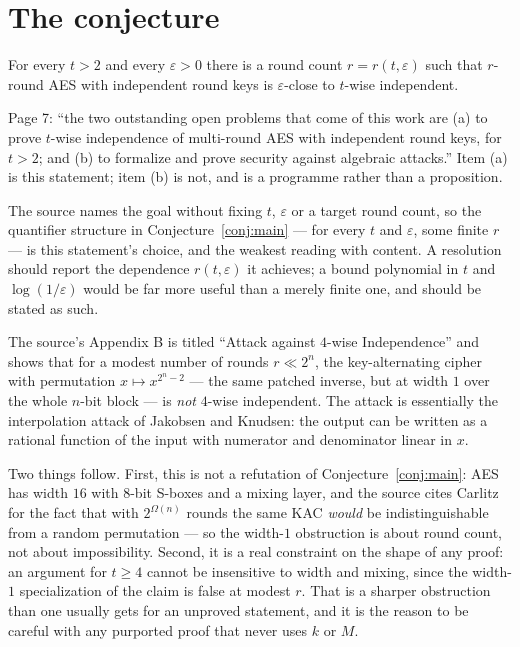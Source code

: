 \documentclass{aicr-conjecture}
\newcommand{\Om}{\Omega}
\newcommand{\eps}{\varepsilon}
\begin{document}
\section{The conjecture}\label{sec:conjectures}

\begin{conjecture}\label{conj:main}
For every $t > 2$ and every $\eps > 0$ there is a round count $r =
r(t,\eps)$ such that $r$-round AES with independent round keys is
$\eps$-close to $t$-wise independent.
\end{conjecture}

\begin{remark}\label{rem:framing}
Page 7: ``the two outstanding open problems that come of this work are
(a) to prove $t$-wise independence of multi-round AES with independent
round keys, for $t > 2$; and (b) to formalize and prove security against
algebraic attacks.'' Item (a) is this statement; item (b) is not, and is
a programme rather than a proposition.

The source names the goal without fixing $t$, $\eps$ or a target round
count, so the quantifier structure in Conjecture~\ref{conj:main} --- for
every $t$ and $\eps$, some finite $r$ --- is this statement's choice, and
the weakest reading with content. A resolution should report the
dependence $r(t,\eps)$ it achieves; a bound polynomial in $t$ and
$\log(1/\eps)$ would be far more useful than a merely finite one, and
should be stated as such.
\end{remark}

\begin{remark}\label{rem:attack}
The source's Appendix B is titled ``Attack against $4$-wise
Independence'' and shows that for a modest number of rounds $r \ll 2^{n}$,
the key-alternating cipher with permutation $x \mapsto x^{2^{n}-2}$ ---
the same patched inverse, but at width $1$ over the whole $n$-bit block
--- is \emph{not} $4$-wise independent. The attack is essentially the
interpolation attack of Jakobsen and Knudsen: the output can be written
as a rational function of the input with numerator and denominator linear
in $x$.

Two things follow. First, this is not a refutation of
Conjecture~\ref{conj:main}: AES has width $16$ with $8$-bit S-boxes and a
mixing layer, and the source cites Carlitz for the fact that with
$2^{\Om(n)}$ rounds the same KAC \emph{would} be indistinguishable from a
random permutation --- so the width-$1$ obstruction is about round count,
not about impossibility. Second, it is a real constraint on the shape of
any proof: an argument for $t \ge 4$ cannot be insensitive to width and
mixing, since the width-$1$ specialization of the claim is false at
modest $r$. That is a sharper obstruction than one usually gets for an
unproved statement, and it is the reason to be careful with any purported
proof that never uses $k$ or $M$.
\end{remark}
\end{document}
